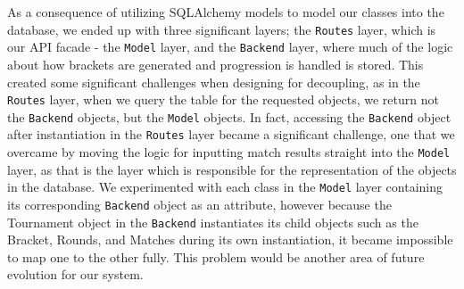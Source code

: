 \documentclass{article}
\begin{document}
As a consequence of utilizing SQLAlchemy models to model our classes into the database, we ended up with three 
significant layers; the \texttt{Routes} layer, which is our API facade - the \texttt{Model} layer, and the \texttt{Backend}
layer, where much of the logic about how brackets are generated and progression is handled is stored. This created some significant
challenges when designing for decoupling, as in the \texttt{Routes} layer, when we query the table for the requested objects,
we return not the \texttt{Backend} objects, but the \texttt{Model} objects. In fact, accessing the \texttt{Backend} object
after instantiation in the \texttt{Routes} layer became a significant challenge, one that we overcame by moving the logic for inputting
match results straight into the \texttt{Model} layer, as that is the layer which is responsible for the representation of the objects 
in the database. We experimented with each class in the \texttt{Model} layer containing its corresponding \texttt{Backend} object 
as an attribute, however because the Tournament object in the \texttt{Backend} instantiates its child objects such as the Bracket, 
Rounds, and Matches during its own instantiation, it became impossible to map one to the other fully. This problem would be another 
area of future evolution for our system.
\end{document}
